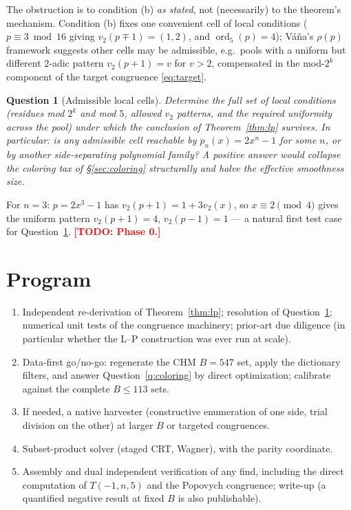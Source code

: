 \documentclass[11pt]{article}
\newtheorem{question}[theorem]{Question}
\theoremstyle{remark}
\newcommand{\todo}[1]{\textcolor{red}{\textbf{[TODO: #1]}}}
\DeclareMathOperator{\ord}{ord}
\begin{document}
The obstruction is to condition (b) \emph{as stated}, not (necessarily) to the
theorem's mechanism. Condition (b) fixes one convenient cell of local
conditions ($p \equiv 3 \bmod 16$ giving $v_2(p\mp1) = (1,2)$, and
$\ord_5(p) = 4$); V\'a\v{n}a's $\rho(p)$ framework suggests other cells may be
admissible, e.g.\ pools with a uniform but different $2$-adic pattern
$v_2(p+1) = v$ for $v > 2$, compensated in the mod-$2^k$ component of the
target congruence \eqref{eq:target}.

\begin{question}[Admissible local cells]\label{q:cells}
Determine the full set of local conditions (residues mod $2^k$ and mod $5$,
allowed $v_2$ patterns, and the required uniformity across the pool) under
which the conclusion of Theorem~\ref{thm:lp} survives. In particular: is any
admissible cell reachable by $p_n(x) = 2x^n - 1$ for some $n$, or by another
side-separating polynomial family? A positive answer would collapse the
coloring tax of \S\ref{sec:coloring} structurally and halve the effective
smoothness size.
\end{question}

\noindent For $n = 3$: $p = 2x^3-1$ has $v_2(p+1) = 1 + 3v_2(x)$, so $x \equiv
2 \pmod 4$ gives the uniform pattern $v_2(p+1) = 4$, $v_2(p-1) = 1$ ---
a natural first test case for Question~\ref{q:cells}. \todo{Phase 0.}

\section{Program}\label{sec:program}

\begin{enumerate}\itemsep1pt
\item[\textbf{P0.}] Independent re-derivation of Theorem~\ref{thm:lp};
resolution of Question~\ref{q:cells}; numerical unit tests of the congruence
machinery; prior-art due diligence (in particular whether the L--P construction
was ever run at scale).
\item[\textbf{P1a.}] Data-first go/no-go: regenerate the CHM $B=547$ set,
apply the dictionary filters, and answer Question~\ref{q:coloring} by direct
optimization; calibrate against the complete $B \le 113$ sets.
\item[\textbf{P1b.}] If needed, a native harvester (constructive enumeration
of one side, trial division on the other) at larger $B$ or targeted
congruences.
\item[\textbf{P2.}] Subset-product solver (staged CRT, Wagner), with the
parity coordinate.
\item[\textbf{P3.}] Assembly and dual independent verification of any find,
including the direct computation of $T(-1,n,5)$ and the Popovych congruence;
write-up (a quantified negative result at fixed $B$ is also publishable).
\end{enumerate}
\end{document}
